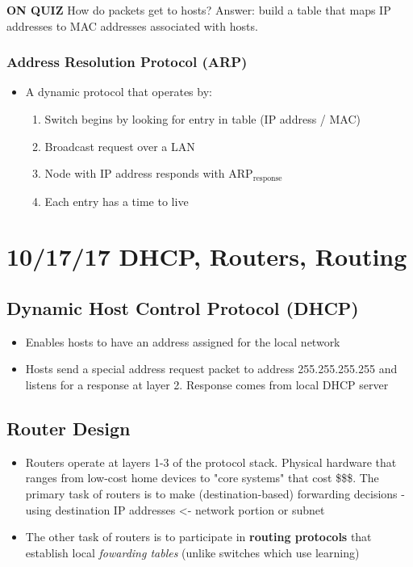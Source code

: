 \documentclass[11pt]{article}
\begin{document}
\textbf{ON QUIZ}
How do packets get to hosts?
Answer: build a table that maps IP addresses to MAC addresses
associated with hosts.

\subsubsection{Address Resolution Protocol (ARP)}
\label{sec:orgheadline58}
\begin{itemize}
\item A dynamic protocol that operates by:
\begin{enumerate}
\item Switch begins by looking for entry in table (IP address / MAC)
\item Broadcast request over a LAN
\item Node with IP address responds with ARP\(_{\text{response}}\)
\item Each entry has a time to live
\end{enumerate}
\end{itemize}

\section{10/17/17  DHCP, Routers, Routing}
\label{sec:orgheadline67}

\subsection{Dynamic Host Control Protocol (DHCP)}
\label{sec:orgheadline61}
\begin{itemize}
\item Enables hosts to have an address assigned for the local network
\item Hosts send a special address request packet to address
255.255.255.255 and listens for a response at layer 2. Response
comes from local DHCP server
\end{itemize}

\subsection{Router Design}
\label{sec:orgheadline62}
\begin{itemize}
\item Routers operate at layers 1-3 of the protocol stack. Physical
hardware that ranges from low-cost home devices to "core systems"
that cost \$\$\$. The primary task of routers is to make
(destination-based) forwarding decisions - using destination IP
addresses <- network portion or subnet
\item The other task of routers is to participate in \textbf{routing protocols}
  that establish local \emph{fowarding tables} (unlike switches which use learning)
\end{itemize}
\end{document}
